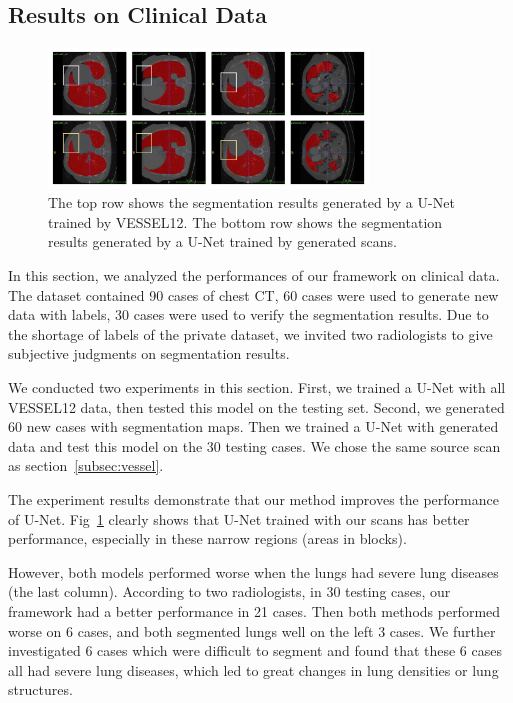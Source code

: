 \documentclass{article}
\begin{document}
\subsection{Results on Clinical Data}
\label{subsec:clinical}
\begin{figure}[t]
    \centerline{\includegraphics[width=85mm]{lungs.pdf}}
    \vspace{-0.5cm}
    \caption{The top row shows the segmentation results generated by a U-Net trained by VESSEL12. The bottom row shows the segmentation results generated by a U-Net trained by generated scans. 
    }
    \vspace{-0.3cm}
    \label{lungs}
    \end{figure}

In this section, we analyzed the performances of our framework on clinical data. The dataset contained 90 cases of chest CT, 60 cases were used to generate new data with labels, 30 cases were used to verify the segmentation results. Due to the shortage of labels of the private dataset, we invited two radiologists to give subjective judgments on segmentation results.

We conducted two experiments in this section.
First, we trained a U-Net with all VESSEL12 data, then tested this model on the testing set.
Second, we generated 60 new cases with segmentation maps. Then we trained a U-Net with generated data and test this model on the 30 testing cases. We chose the same source scan as section~\ref{subsec:vessel}.

The experiment results demonstrate that our method improves the performance of U-Net. Fig~\ref{lungs} clearly shows that U-Net trained with our scans has better performance, especially in these narrow regions (areas in blocks). 

However, both models performed worse when the lungs had severe lung diseases (the last column).
According to two radiologists, in 30 testing cases, our framework had a better performance in 21 cases. Then both methods performed worse on 6 cases, and both segmented lungs well on the left 3 cases.
We further investigated 6 cases which were difficult to segment and found that these 6 cases all had severe lung diseases, which led to great changes in lung densities or lung structures. 
\end{document}
